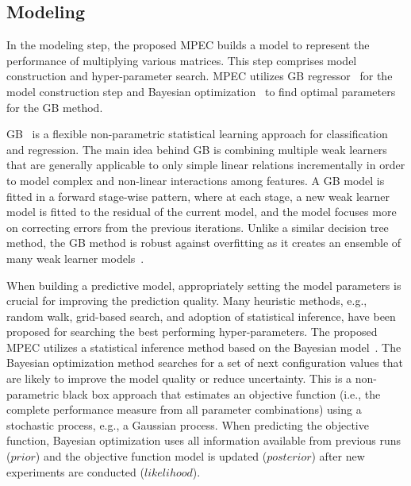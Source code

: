 \documentclass[10pt, conference, compsocconf]{IEEEtran}
\begin{document}
\subsection{Modeling}\label{sec:modeling}
In the modeling step, the proposed MPEC builds a model to represent the performance of multiplying various matrices. This step comprises model construction and hyper-parameter search. MPEC utilizes GB regressor~\cite{gradient-boosting} for the model construction step and Bayesian optimization~\cite{bayesian-optimization} to find optimal parameters for the GB method.

GB~\cite{gradient-boosting} is a flexible non-parametric statistical learning approach for classification and regression. The main idea behind GB is combining multiple weak learners that are generally applicable to only simple linear relations incrementally in order to model complex and non-linear interactions among features. A GB model is fitted in a forward stage-wise pattern, where at each stage, a new weak learner model is fitted to the residual of the current model, and the model focuses more on correcting errors from the previous iterations. Unlike a similar decision tree method, the GB method is robust against overfitting as it creates an ensemble of many weak learner models~\cite{random-forest}.

When building a predictive model, appropriately setting the model parameters is crucial for improving the prediction quality. Many heuristic methods, e.g., random walk, grid-based search, and adoption of statistical inference, have been proposed for searching the best performing hyper-parameters. The proposed MPEC utilizes a statistical inference method based on the Bayesian model~\cite{bayesian-optimization}. The Bayesian optimization method searches for a set of next configuration values that are likely to improve the model quality or reduce uncertainty. This is a non-parametric black box approach that estimates an objective function (i.e., the complete performance measure from all parameter combinations) using a stochastic process, e.g., a Gaussian process. When predicting the objective function, Bayesian optimization uses all information available from previous runs ($prior$) and the objective function model is updated ($posterior$) after new experiments are conducted ($likelihood$).
\end{document}
